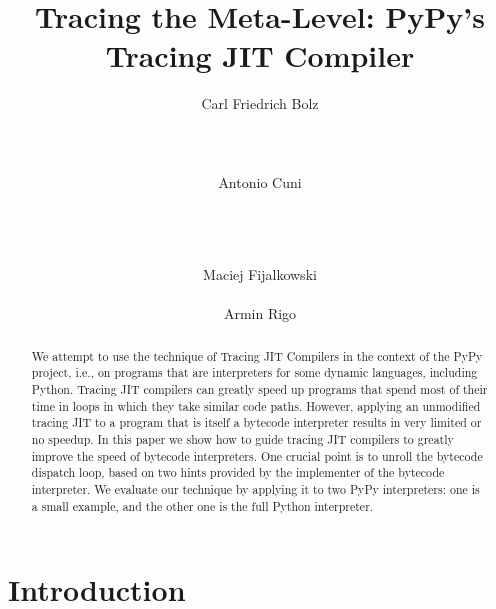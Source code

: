 \documentclass{sig-alternate}
\newcommand\ie{i.e.,\xspace}
\begin{document}
\title{Tracing the Meta-Level: PyPy's Tracing JIT Compiler}

\author{
\alignauthor Carl Friedrich Bolz\\
       \\
       \\
       \\
\alignauthor Antonio Cuni\\
       \\
       \\
       \\
\and
\alignauthor Maciej Fijalkowski\\
       \\
\alignauthor Armin Rigo\\
}
\maketitle



\begin{abstract}

We attempt to use the technique of Tracing JIT Compilers
in the context
of the PyPy project, \ie on programs that are interpreters for some
dynamic languages, including Python.  Tracing JIT compilers can greatly
speed up programs that spend most of their time in loops in which they
take similar code paths.  However, applying an unmodified tracing JIT to
a program that is itself a bytecode interpreter results in very limited
or no speedup.
In this paper we show how to guide tracing JIT compilers to greatly
improve the speed of bytecode interpreters.  One crucial point is to
unroll the bytecode dispatch loop, based on two hints provided by the
implementer of the bytecode interpreter.  We evaluate our technique by
applying it to two PyPy interpreters: one is a small example, and the
other one is the full Python interpreter.

\end{abstract}


\section{Introduction}
\end{document}
